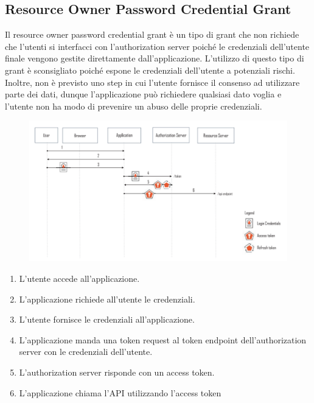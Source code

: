 \subsection{Resource Owner Password Credential Grant}

Il resource owner password credential grant è un tipo di grant che non richiede che
l'utenti si interfacci con l'authorization server poiché le credenziali dell'utente
finale vengono gestite direttamente dall'applicazione. L'utilizzo di questo
tipo di grant è sconsigliato poiché espone le credenziali dell'utente a potenziali rischi.
Inoltre, non è previsto uno step in cui l'utente fornisce il consenso ad utilizzare parte
dei dati, dunque l'applicazione può richiedere qualsiasi dato voglia e l'utente non ha
modo di prevenire un abuso delle proprie credenziali.

\begin{figure}[H]
      \centering
      \includegraphics[width=\textwidth, keepaspectratio]{capitoli/id_managing/imgs/passgrant.png}
\end{figure}

\begin{enumerate}
      \item L'utente accede all'applicazione.
      \item L'applicazione richiede all'utente le credenziali.
      \item L'utente fornisce le credenziali all'applicazione.
      \item L'applicazione manda una token request al token endpoint dell'authorization
            server con le credenziali dell'utente.
      \item L'authorization server risponde con un access token.
      \item L'applicazione chiama l'API utilizzando l'access token
\end{enumerate}

